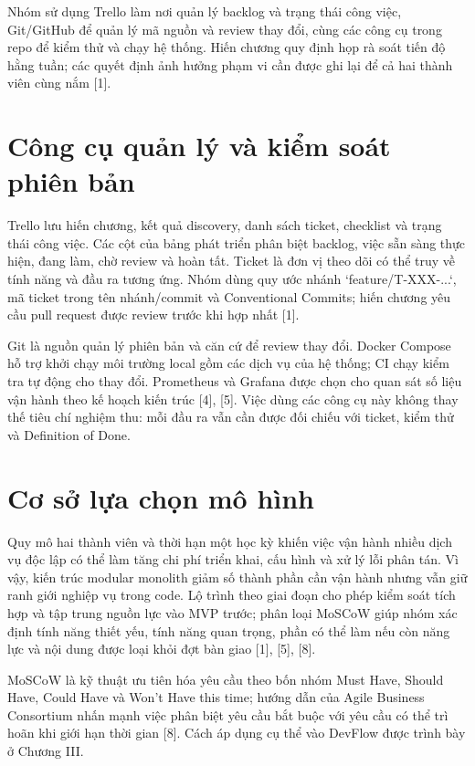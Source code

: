 \documentclass[12pt,a4paper]{report}
\begin{document}
Nhóm sử dụng Trello làm nơi quản lý backlog và trạng thái công việc, Git/GitHub để quản lý mã nguồn và review thay đổi, cùng các công cụ trong repo để kiểm thử và chạy hệ thống. Hiến chương quy định họp rà soát tiến độ hằng tuần; các quyết định ảnh hưởng phạm vi cần được ghi lại để cả hai thành viên cùng nắm [1].

\section{Công cụ quản lý và kiểm soát phiên bản}
Trello lưu hiến chương, kết quả discovery, danh sách ticket, checklist và trạng thái công việc. Các cột của bảng phát triển phân biệt backlog, việc sẵn sàng thực hiện, đang làm, chờ review và hoàn tất. Ticket là đơn vị theo dõi có thể truy về tính năng và đầu ra tương ứng. Nhóm dùng quy ước nhánh `feature/T-XXX-...`, mã ticket trong tên nhánh/commit và Conventional Commits; hiến chương yêu cầu pull request được review trước khi hợp nhất [1].

Git là nguồn quản lý phiên bản và căn cứ để review thay đổi. Docker Compose hỗ trợ khởi chạy môi trường local gồm các dịch vụ của hệ thống; CI chạy kiểm tra tự động cho thay đổi. Prometheus và Grafana được chọn cho quan sát số liệu vận hành theo kế hoạch kiến trúc [4], [5]. Việc dùng các công cụ này không thay thế tiêu chí nghiệm thu: mỗi đầu ra vẫn cần được đối chiếu với ticket, kiểm thử và Definition of Done.

\section{Cơ sở lựa chọn mô hình}
Quy mô hai thành viên và thời hạn một học kỳ khiến việc vận hành nhiều dịch vụ độc lập có thể làm tăng chi phí triển khai, cấu hình và xử lý lỗi phân tán. Vì vậy, kiến trúc modular monolith giảm số thành phần cần vận hành nhưng vẫn giữ ranh giới nghiệp vụ trong code. Lộ trình theo giai đoạn cho phép kiểm soát tích hợp và tập trung nguồn lực vào MVP trước; phân loại MoSCoW giúp nhóm xác định tính năng thiết yếu, tính năng quan trọng, phần có thể làm nếu còn năng lực và nội dung được loại khỏi đợt bàn giao [1], [5], [8].

MoSCoW là kỹ thuật ưu tiên hóa yêu cầu theo bốn nhóm Must Have, Should Have, Could Have và Won't Have this time; hướng dẫn của Agile Business Consortium nhấn mạnh việc phân biệt yêu cầu bắt buộc với yêu cầu có thể trì hoãn khi giới hạn thời gian [8]. Cách áp dụng cụ thể vào DevFlow được trình bày ở Chương III.
\end{document}
